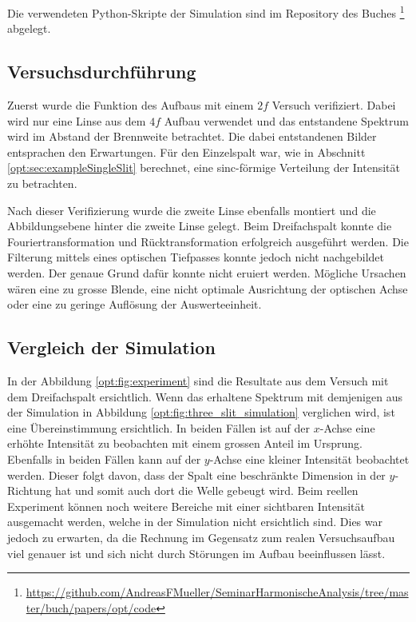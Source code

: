 Die verwendeten Python-Skripte der Simulation sind im Repository des Buches 
\footnote{\url{https://github.com/AndreasFMueller/SeminarHarmonischeAnalysis/tree/master/buch/papers/opt/code}}
abgelegt.

\subsection{Versuchsdurchführung}
Zuerst wurde die Funktion des Aufbaus mit einem $2f$ Versuch verifiziert.
Dabei wird nur eine Linse aus dem $4f$ Aufbau verwendet und das entstandene Spektrum wird im Abstand der Brennweite betrachtet.
Die dabei entstandenen Bilder entsprachen den Erwartungen.
Für den Einzelspalt war, wie in Abschnitt \ref{opt:sec:exampleSingleSlit} berechnet, eine sinc-förmige Verteilung der Intensität zu betrachten.

Nach dieser Verifizierung wurde die zweite Linse ebenfalls montiert und die Abbildungsebene hinter die zweite Linse gelegt.
Beim Dreifachspalt konnte die Fouriertransformation und Rücktransformation erfolgreich ausgeführt werden.
Die Filterung mittels eines optischen Tiefpasses konnte jedoch nicht nachgebildet werden.
Der genaue Grund dafür konnte nicht eruiert werden.
Mögliche Ursachen wären eine zu grosse Blende, eine nicht optimale Ausrichtung der optischen Achse oder eine zu geringe Auflösung der Auswerteeinheit.

\subsection{Vergleich der Simulation}
In der Abbildung \ref{opt:fig:experiment} sind die Resultate aus dem Versuch mit dem Dreifachspalt ersichtlich.
Wenn das erhaltene Spektrum mit demjenigen aus der Simulation in Abbildung \ref{opt:fig:three_slit_simulation} verglichen wird, ist eine Übereinstimmung ersichtlich.
In beiden Fällen ist auf der $x$-Achse eine erhöhte Intensität zu beobachten mit einem grossen Anteil im Ursprung.
Ebenfalls in beiden Fällen kann auf der $y$-Achse eine kleiner Intensität beobachtet werden.
Dieser folgt davon, dass der Spalt eine beschränkte Dimension in der $y$-Richtung hat und somit auch dort die Welle gebeugt wird.
Beim reellen Experiment können noch weitere Bereiche mit einer sichtbaren Intensität ausgemacht werden, welche in der Simulation nicht ersichtlich sind.
Dies war jedoch zu erwarten, da die Rechnung im Gegensatz zum realen Versuchsaufbau viel genauer ist und sich nicht durch Störungen im Aufbau beeinflussen lässt.


